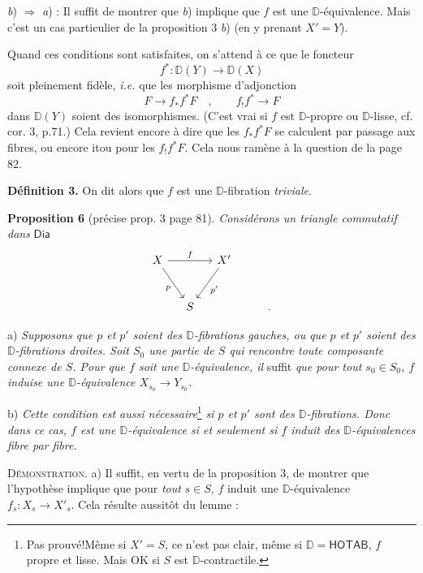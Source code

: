 \documentclass[11pt]{article}
\newcommand{\printedpage}[1]{\marginpar{\footnotesize p.~#1}}
\newcommand{\msp}[1]{\marginpar{\footnotesize [#1]}}
\newcommand{\DD}{\mathbb{D}}
\newcommand{\Dia}{\mathsf{Dia}}
\begin{document}
\textit{b}) $\Rightarrow$ \textit{a}) : Il suffit de montrer que \textit{b}) implique que $f$ est une $\DD$-équivalence. Mais c'est un cas particulier de la proposition 3 \textit{b}) (en y prenant $X' = Y$).

\msp{page 84}

Quand ces conditions sont satisfaites, on s'attend à ce que le foncteur
\[
f^* : \DD(Y) \longrightarrow \DD(X)
\]
soit pleinement fidèle, \textit{i.e.} que les morphisme d'adjonction %
\[
F \longrightarrow f_*f^*F \quad , \qquad f_!f^* \longrightarrow F %
\]
dans $\DD(Y)$ soient des isomorphismes. (C'est vrai si $f$ est $\DD$-propre ou $\DD$-lisse, cf. cor. 3, p.71.) Cela revient encore à dire que les $f_*f^*F$ se calculent par passage aux fibres, ou encore itou pour les $f_!f^*F$. Cela nous ramène à la question de la page 82.

\textbf{Définition 3.} On dit alors que $f$ est une $\DD$-fibration \textit{triviale}.

\textbf{Proposition 6} (précise prop. 3 page 81). \textit{Considérons un triangle commutatif dans} $\Dia$
\[
\begin{tikzcd}[column sep=small, row sep=large]
X \arrow[rr, "f"] \arrow[dr, "p"'] & & X' \arrow[dl, "p'"] \\
& S & & & .
\end{tikzcd}
\]

\printedpage{52}

\indent a) \textit{Supposons que $p$ et $p'$ soient des $\DD$-fibrations gauches, ou que $p$ et $p'$ soient des $\DD$-fibrations droites. Soit $S_0$ une partie de $S$ qui rencontre toute composante connexe de $S$. Pour que $f$ soit une $\DD$-équivalence, il} suffit \textit{que pour tout $s_0 \in S_0$, $f$ induise une $\DD$-équivalence $X_{s_0} \to Y_{s_0}$.}

\indent b) \textit{Cette condition est aussi nécessaire}\footnote[40]{Pas prouvé!\footnotemark[41] Même si $X' = S$, ce n'est pas clair, même si $\DD = \mathsf{HOTAB}$, $f$ propre et lisse. Mais OK si $S$ est $\DD$-contractile.} \textit{si $p$ et $p'$ sont des $\DD$-fibrations. Donc dans ce cas, $f$ est une $\DD$-équivalence si et seulement si $f$ induit des $\DD$-équivalences fibre par fibre.}

\msp{page 85}

\textsc{Démonstration.} a) Il suffit, en vertu de la proposition 3, de montrer que l'hypothèse implique que pour \textit{tout} $s \in S$, $f$ induit une $\DD$-équivalence $f_s : X_s \to X'_s$. Cela résulte aussitôt du lemme :
\end{document}

